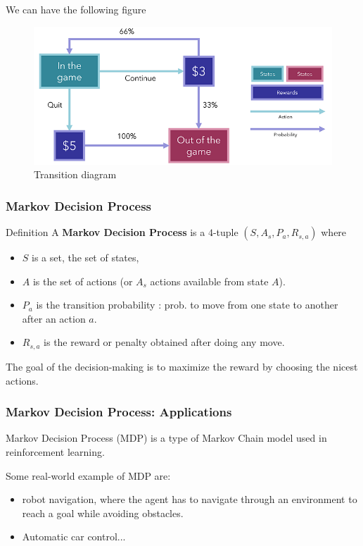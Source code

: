 \documentclass{beamer}
\begin{document}
\begin{frame}
	We can have the following figure
\begin{figure}
		\begin{center}
		\includegraphics[scale=.4]{states}	
	\end{center}
\caption{Transition diagram}	
\end{figure}
\end{frame}	
\begin{frame}
\frametitle{Markov Decision Process}
\begin{block}{Definition}
	A \textbf{Markov Decision Process} is a $4$-tuple $(S, A_s, P_a, R_{s,a})$ where
	\begin{itemize}
		\item $S$ is a set, the set of states,
		\item $A$ is the set of actions (or $A_s$ actions available from state $A$).
		\item $P_a$ is the transition probability : prob. to move from one state to another after an action $a$.
		\item $R_{s,a}$ is the reward or penalty obtained after doing any move. 
	\end{itemize}
\end{block}
The goal of the decision-making is to maximize the reward by choosing the nicest actions.
\end{frame}
	\begin{frame}
	\frametitle{Markov Decision Process: Applications}

		 Markov Decision Process (MDP) is a type of Markov Chain model used in reinforcement learning.
		
		Some real-world example of MDP are:
	\begin{itemize}
		\item  robot navigation, where the agent has to navigate through an environment to reach a goal while avoiding obstacles.
		\item Automatic car control...
	\end{itemize}
\end{frame}
\end{document}
